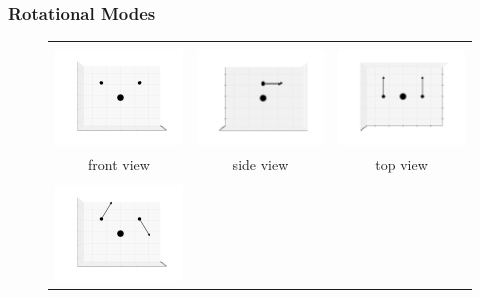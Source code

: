 \documentclass[11pt]{article}
\begin{document}
\subsubsection{Rotational Modes}
\label{rot}
\begin{figure}[htp]
	\centering
	\begin{tabular}{|ccc|}\hline&&\\
	\includegraphics[width=5.5cm,clip=true,trim=3cm 2cm 3cm 2cm]{images/0-0_3.pdf}&
	\includegraphics[width=5.5cm,clip=true,trim=3cm 2cm 3cm 2cm]{images/0-90_3.pdf}&
	\includegraphics[width=5.5cm,clip=true,trim=3cm 2cm 3cm 2cm]{images/90-0_3.pdf}\\front view&side view&top view\\\hline&&\\
	\includegraphics[width=5.5cm,clip=true,trim=3cm 2cm 3cm 2cm]{images/0-0_4.pdf}&

\end{tabular}
\end{figure}
\end{document}
